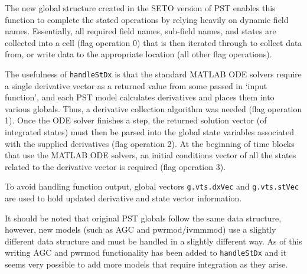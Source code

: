 The new global structure created in the SETO version of PST enables this function to complete the stated operations by relying heavily on dynamic field names. 
Essentially, all required field names, sub-field names, and states are collected into a cell (flag operation 0) that is then iterated through to collect data from, or write data to the appropriate location (all other flag operations).

The usefulness of \verb|handleStDx| is that the standard MATLAB ODE solvers require a single derivative vector as a returned value from some passed in `input function', and each PST model calculates derivatives and places them into various globals. 
Thus, a derivative collection algorithm was needed (flag operation 1).
Once the ODE solver finishes a step, the returned solution vector (of integrated states) must then be parsed into the global state variables associated with the supplied derivatives (flag operation 2).
At the beginning of time blocks that use the MATLAB ODE solvers, an initial conditions vector of all the states related to the derivative vector is required (flag operation 3).

To avoid handling function output, global vectors \verb|g.vts.dxVec| and \verb|g.vts.stVec| are used to hold updated derivative and state vector information.

It should be noted that original PST globals follow the same data structure,
however, new models (such as AGC and pwrmod/ivmmmod) use a slightly different data structure and must be handled in a slightly different way.
As of this writing AGC and pwrmod functionality has been added to \verb|handleStDx| and it seems very possible to add more models that require integration as they arise.


